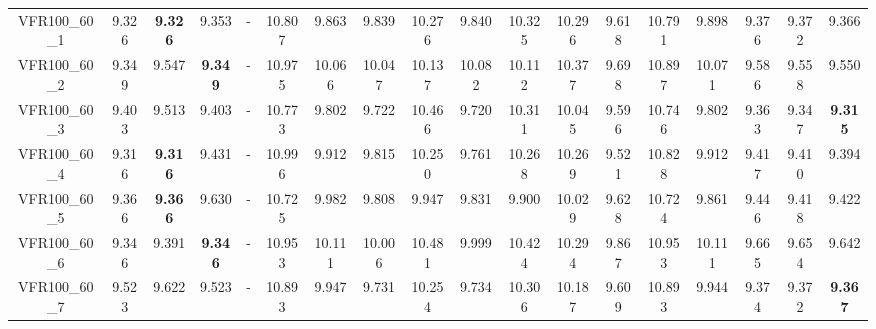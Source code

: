 \begin{tabular}{cc|ccc|ccccccccccccc}
VFR100\_60\_1      & 9.326            & {\bf 9.326}      & 9.353            & -                & 10.807           & 9.863            & 9.839            & 10.276           & 9.840            & 10.325           & 10.296           & 9.618            & 10.791           & 9.898            & 9.376            & 9.372            & 9.366           \\ 
VFR100\_60\_2      & 9.349            & 9.547            & {\bf 9.349}      & -                & 10.975           & 10.066           & 10.047           & 10.137           & 10.082           & 10.112           & 10.377           & 9.698            & 10.897           & 10.071           & 9.586            & 9.558            & 9.550           \\ 
VFR100\_60\_3      & 9.403            & 9.513            & 9.403            & -                & 10.773           & 9.802            & 9.722            & 10.466           & 9.720            & 10.311           & 10.045           & 9.596            & 10.746           & 9.802            & 9.363            & 9.347            & {\bf 9.315}     \\ 
VFR100\_60\_4      & 9.316            & {\bf 9.316}      & 9.431            & -                & 10.996           & 9.912            & 9.815            & 10.250           & 9.761            & 10.268           & 10.269           & 9.521            & 10.828           & 9.912            & 9.417            & 9.410            & 9.394           \\ 
VFR100\_60\_5      & 9.366            & {\bf 9.366}      & 9.630            & -                & 10.725           & 9.982            & 9.808            & 9.947            & 9.831            & 9.900            & 10.029           & 9.628            & 10.724           & 9.861            & 9.446            & 9.418            & 9.422           \\ 
VFR100\_60\_6      & 9.346            & 9.391            & {\bf 9.346}      & -                & 10.953           & 10.111           & 10.006           & 10.481           & 9.999            & 10.424           & 10.294           & 9.867            & 10.953           & 10.111           & 9.665            & 9.654            & 9.642           \\ 
VFR100\_60\_7      & 9.523            & 9.622            & 9.523            & -                & 10.893           & 9.947            & 9.731            & 10.254           & 9.734            & 10.306           & 10.187           & 9.609            & 10.893           & 9.944            & 9.374            & 9.372            & {\bf 9.367}     \\ 

\end{tabular}
